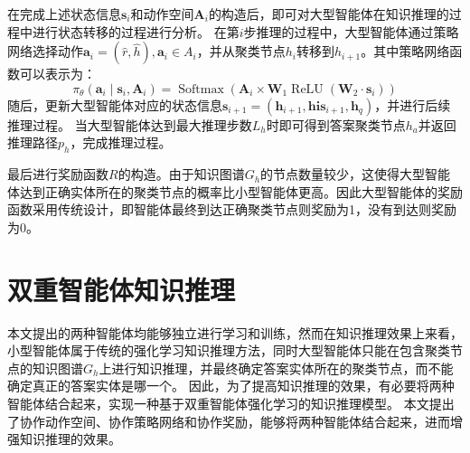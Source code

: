 \documentclass[algorithmlist, AutoFakeBold, AutoFakeSlant, figurelist, tablelist, nomlist, engineering]{seuthesix}
\begin{document}
在完成上述状态信息$\bm{s}_i$和动作空间$\bm{A}_i$的构造后，即可对大型智能体在知识推理的过程中进行状态转移的过程进行分析。
在第$i$步推理的过程中，大型智能体通过策略网络选择动作$\bm{a}_i = (\hat{r}, \hat{h}), \bm{a}_i \in A_i$，并从聚类节点$h_i$转移到$h_{i+1}$。其中策略网络函数可以表示为：
\begin{equation}
  \pi_\theta\left(\bm{a}_i \mid \bm{s}_i, \bm{A}_i\right) =\operatorname{Softmax}\left(\bm{A}_i \times \mathbf{W}_1 \operatorname{ReLU}\left(\mathbf{W}_2 \cdot \bm{s}_i\right)\right)
\end{equation}
随后，更新大型智能体对应的状态信息$\bm{s}_{i+1} = (\bm{h}_{i+1}, \bm{his}_{i+1}, \bm{h}_q)$，并进行后续推理过程。
当大型智能体达到最大推理步数$L_h$时即可得到答案聚类节点$h_a$并返回推理路径$p_h$，完成推理过程。

最后进行奖励函数$R$的构造。由于知识图谱$G_h$的节点数量较少，这使得大型智能体达到正确实体所在的聚类节点的概率比小型智能体更高。因此大型智能体的奖励函数采用传统设计，即智能体最终到达正确聚类节点则奖励为1，没有到达则奖励为0。

\section{双重智能体知识推理}
本文提出的两种智能体均能够独立进行学习和训练，然而在知识推理效果上来看，小型智能体属于传统的强化学习知识推理方法，同时大型智能体只能在包含聚类节点的知识图谱$G_h$上进行知识推理，并最终确定答案实体所在的聚类节点，而不能确定真正的答案实体是哪一个。
因此，为了提高知识推理的效果，有必要将两种智能体结合起来，实现一种基于双重智能体强化学习的知识推理模型。
本文提出了协作动作空间、协作策略网络和协作奖励，能够将两种智能体结合起来，进而增强知识推理的效果。
\end{document}
